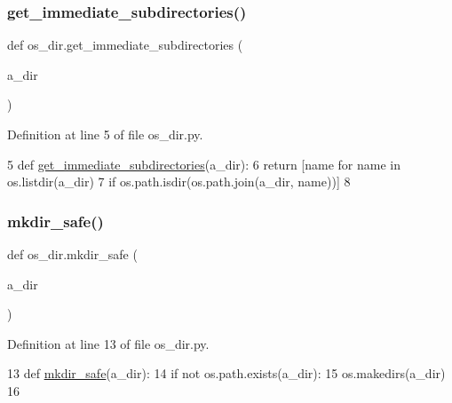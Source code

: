 \subsubsection{\texorpdfstring{get\+\_\+immediate\+\_\+subdirectories()}{get\_immediate\_subdirectories()}}
{\footnotesize\ttfamily def os\+\_\+dir.\+get\+\_\+immediate\+\_\+subdirectories (\begin{DoxyParamCaption}\item[{}]{a\+\_\+dir }\end{DoxyParamCaption})}



Definition at line 5 of file os\+\_\+dir.\+py.


\begin{DoxyCode}
5 \textcolor{keyword}{def }\mbox{\hyperlink{namespaceos__dir_a7734a1131db0cd10af8ee0a4d9c5241d}{get\_immediate\_subdirectories}}(a\_dir):
6     \textcolor{keywordflow}{return} [name \textcolor{keywordflow}{for} name \textcolor{keywordflow}{in} os.listdir(a\_dir)
7             \textcolor{keywordflow}{if} os.path.isdir(os.path.join(a\_dir, name))]
8     
\end{DoxyCode}
\mbox{\label{namespaceos__dir_ad1414a4868a8da9c6cd962203048d22c}} 
\subsubsection{\texorpdfstring{mkdir\+\_\+safe()}{mkdir\_safe()}}
{\footnotesize\ttfamily def os\+\_\+dir.\+mkdir\+\_\+safe (\begin{DoxyParamCaption}\item[{}]{a\+\_\+dir }\end{DoxyParamCaption})}



Definition at line 13 of file os\+\_\+dir.\+py.


\begin{DoxyCode}
13 \textcolor{keyword}{def }\mbox{\hyperlink{namespaceos__dir_ad1414a4868a8da9c6cd962203048d22c}{mkdir\_safe}}(a\_dir):
14     \textcolor{keywordflow}{if} \textcolor{keywordflow}{not} os.path.exists(a\_dir):
15         os.makedirs(a\_dir)
16         
\end{DoxyCode}
